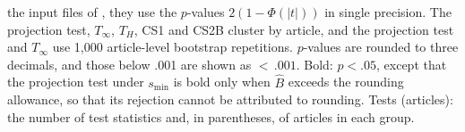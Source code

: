 \begin{table}[t]
\begin{threeparttable}
\begin{tablenotes}[flushleft]
the input files of \citet{brodeur2024}, they use the $p$-values $2(1-\Phi(|t|))$ in single precision. The projection test, $T_\infty$, $T_H$, CS1 and CS2B cluster by article, and the projection test and $T_\infty$ use 1,000 article-level bootstrap repetitions. $p$-values are rounded to three decimals, and those below .001 are shown as ${<}\,.001$. Bold: $p<.05$, except that the projection test under $s_{\min}$ is bold only when $\widehat{B}$ exceeds the rounding allowance, so that its rejection cannot be attributed to rounding. Tests (articles): the number of test statistics and, in parentheses, of articles in each group.
\end{tablenotes}
\end{threeparttable}
\end{table}
